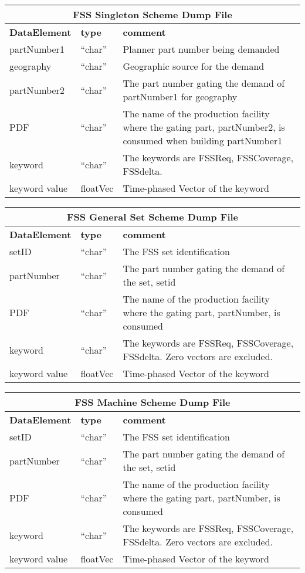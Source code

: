 \begin{tabular}{llp{4in}}
\multicolumn{3}{c}{{\bf FSS Singleton Scheme Dump File}}\\ \hline\hline
{\bf DataElement} &  {\bf type}  &   {\bf comment} \\ \hline
partNumber1 & ``char'' & Planner part number being demanded    \\ 
geography & ``char'' & Geographic source for the demand \\
partNumber2 & ``char'' & The part number gating the demand of partNumber1 for
 geography \\
PDF & ``char'' & The name of the production facility where the gating 
 part, partNumber2, is consumed when building partNumber1 \\
keyword & ``char''  & The keywords are FSSReq, FSSCoverage, FSSdelta. \\
keyword value  & floatVec &  Time-phased Vector of the keyword 
\end{tabular}

\vspace{.5in}

\begin{tabular}{llp{4in}}
\multicolumn{3}{c}{{\bf FSS General Set Scheme Dump File}}\\ \hline\hline
{\bf DataElement} &  {\bf type}  &   {\bf comment} \\ \hline
setID & ``char'' & The FSS set identification\\
partNumber & ``char'' & The part number gating the demand of the set, setid \\
PDF & ``char'' & The name of the production facility where the gating 
 part, partNumber, is consumed  \\
keyword & ``char''  & The keywords are FSSReq, FSSCoverage, FSSdelta.
    Zero vectors are excluded.\\
keyword value  & floatVec &  Time-phased Vector of the keyword 
\end{tabular}

\vspace{.5in}

\begin{tabular}{llp{4in}}
\multicolumn{3}{c}{{\bf FSS Machine Scheme Dump File}}\\ \hline\hline
{\bf DataElement} &  {\bf type}  &   {\bf comment} \\ \hline
setID & ``char'' & The FSS set identification\\
partNumber & ``char'' & The part number gating the demand of the set, setid \\
PDF & ``char'' & The name of the production facility where the gating 
 part, partNumber, is consumed  \\
keyword & ``char''  & The keywords are FSSReq, FSSCoverage, FSSdelta.
    Zero vectors are excluded.\\
keyword value  & floatVec &  Time-phased Vector of the keyword 
\end{tabular}


